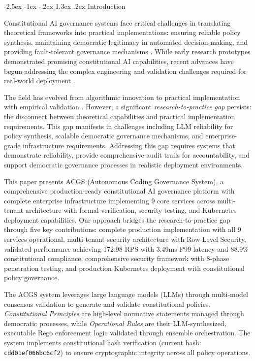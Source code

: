 \documentclass[manuscript,screen,9pt]{acmart}
\makeatletter
\renewcommand\section{\@startsection{section}{1}{\z@}%
  {-2.5ex \@plus -1ex \@minus -.2ex}%
  {1.3ex \@plus.2ex}%
  {\normalfont\Large\bfseries}}
\makeatother
\begin{document}
\section{Introduction}
\label{sec:introduction}

Constitutional AI governance systems face critical challenges in translating theoretical frameworks into practical implementations: ensuring reliable policy synthesis, maintaining democratic legitimacy in automated decision-making, and providing fault-tolerant governance mechanisms \cite{Bai2025ConstitutionalAI, Hwang2025PublicCAI}. While early research prototypes demonstrated promising constitutional AI capabilities, recent advances have begun addressing the complex engineering and validation challenges required for real-world deployment \cite{Taeihagh2025Governing, WorldBank2024AIGovernance}.

The field has evolved from algorithmic innovation to practical implementation with empirical validation \cite{StanfordJBLP2024AIGovernanceWeb3, StanfordLaw2025BulletProof}. However, a significant \textit{research-to-practice gap} persists: the disconnect between theoretical capabilities and practical implementation requirements. This gap manifests in challenges including LLM reliability for policy synthesis, scalable democratic governance mechanisms, and enterprise-grade infrastructure requirements. Addressing this gap requires systems that demonstrate reliability, provide comprehensive audit trails for accountability, and support democratic governance processes in realistic deployment environments.

This paper presents ACGS (Autonomous Coding Governance System), a comprehensive production-ready constitutional AI governance platform with complete enterprise infrastructure implementing 9 core services across multi-tenant architecture with formal verification, security testing, and Kubernetes deployment capabilities. Our approach bridges the research-to-practice gap through five key contributions: complete production implementation with all 9 services operational, multi-tenant security architecture with Row-Level Security, validated performance achieving 172.98 RPS with 3.49ms P99 latency and 88.9\% constitutional compliance, comprehensive security framework with 8-phase penetration testing, and production Kubernetes deployment with constitutional policy governance.

The ACGS system leverages large language models (LLMs) through multi-model consensus validation to generate and validate constitutional policies. \textit{Constitutional Principles} are high-level normative statements managed through democratic processes, while \textit{Operational Rules} are their LLM-synthesized, executable Rego enforcement logic validated through ensemble orchestration. The system implements constitutional hash verification (current hash: \texttt{cdd01ef066bc6cf2\cite{perf-report}\cite{perf-report}}) to ensure cryptographic integrity across all policy operations.
\end{document}
